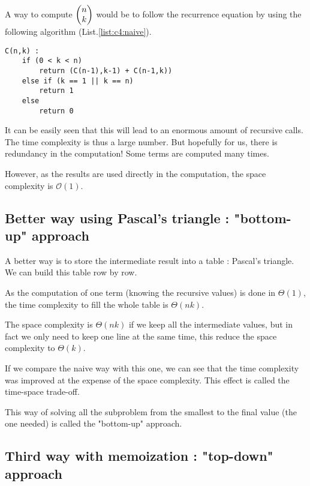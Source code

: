 A way to compute $\left( \begin{matrix} n\\ k\end{matrix} \right)$ would be to follow the recurrence equation by using the following algorithm (List.\ref{list:c4:naive}).

\begin{lstlisting}[label={list:c4:naive},caption=Pseudo-code of the naive algorithm for the combinatorial]
C(n,k) :
    if (0 < k < n)
        return (C(n-1),k-1) + C(n-1,k))
    else if (k == 1 || k == n)
        return 1
    else
        return 0
\end{lstlisting}

It can be easily seen that this will lead to an enormous amount of recursive calls. The time complexity is thus a large number. But hopefully for us, there is redundancy in the computation! Some terms are computed many times. 

However, as the results are used directly in the computation, the space complexity is $\mathcal{O}(1)$.



        \subsection{Better way using Pascal's triangle : "bottom-up" approach}




A better way is to store the intermediate result into a table : Pascal's triangle. We can build this table row by row.

As the computation of one term (knowing the recursive values) is done in $\Theta (1)$, the time complexity to fill the whole table is $\Theta (nk)$.

The space complexity is $\Theta (nk)$ if we keep all the intermediate values, but in fact we only need to keep one line at the same time, this reduce the space complexity to $\Theta (k)$.

If we compare the naive way with this one, we can see that the time complexity was improved at the expense of the space complexity. This effect is called the time-space trade-off.

This way of solving all the subproblem from the smallest to the final value (the one needed) is called the "bottom-up" approach.



        \subsection{Third way with memoization : "top-down" approach} 



